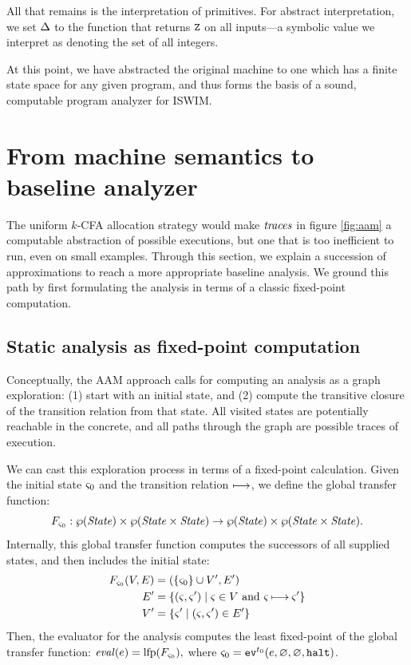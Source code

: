 \documentclass[9pt]{sigplanconf} %
\begin{document}
All that remains is the interpretation of primitives.  For abstract
interpretation, we set $\interpdelta$ to the function that returns
$\sNum$ on all inputs---a symbolic value we interpret as denoting the
set of all integers.

At this point, we have abstracted the original machine to one which
has a finite state space for any given program, and thus forms the
basis of a sound, computable program analyzer for ISWIM.

\section{From machine semantics to baseline analyzer}
\label{sec:baseline}

The uniform $k$-CFA allocation strategy would make $\traces$ in figure
\ref{fig:aam} a computable abstraction of possible executions, but one
that is too inefficient to run, even on small examples.  Through this
section, we explain a succession of approximations to reach a more
appropriate baseline analysis.
%
We ground this path by first formulating the analysis in terms of a
classic fixed-point computation.


\subsection{Static analysis as fixed-point computation}
\label{sec:fixpoint}

Conceptually, the AAM approach calls for computing an analysis as a
graph exploration: (1) start with an initial state, and (2) compute
the transitive closure of the transition relation from that state. All
visited states are potentially reachable in the concrete, and all
paths through the graph are possible traces of execution.

We can cast this exploration process in terms of a fixed-point calculation.
%
Given the initial state $\mstate_0$ and the transition relation $\machstep$,
we define the global transfer function:
\begin{equation*}
 F_{\mstate_0} : \wp(\State) \times \wp(\State\times\State) \to \wp(\State) \times \wp(\State\times\State)\text.
\end{equation*}
Internally, this global transfer function computes the successors of all supplied states, and then includes the initial state:
\begin{align*}
  F_{\mstate_0}(V,E) &= (\{ \mstate_0 \} \cup V', E') \\
    E' &= \setof{ (\mstate,\mstate') \mid \mstate \in V \text{ and } \mstate \machstep \mstate'} \\
    V' &= \setof{ \mstate' \mid (\mstate,\mstate') \in E'}
\end{align*}
Then, the evaluator for the analysis computes the least fixed-point of the global transfer function:
 $\eval(\mexp) = \mathrm{lfp}(F_{\mstate_0})\text{,}$
where $\mstate_0 = \ev[^\mtcntr]{\mexp, \varnothing, \varnothing, \kmt}$.
\end{document}
